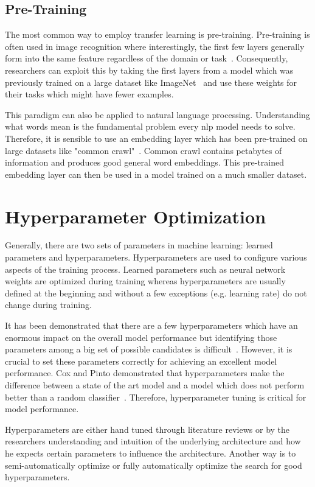 \subsection*{Pre-Training}
The most common way to employ transfer learning is pre-training. 
Pre-training is often used in image recognition where interestingly, the first few layers generally form into the same feature regardless of the domain or task~\cite{Yosinski2014}. Consequently, researchers can exploit this by taking the first layers from a model which was previously trained on a large dataset like ImageNet~\cite{Russakovsky2015} and use these weights for their tasks which might have fewer examples.
\medskip

This paradigm can also be applied to natural language processing. Understanding what words mean is the fundamental problem every \gls{nlp} model needs to solve. Therefore, it is sensible to use an embedding layer which has been pre-trained on large datasets like "common crawl"~\cite{commonCrawl}. Common crawl contains petabytes of information and produces good general word embeddings. This pre-trained embedding layer can then be used in a model trained on a much smaller dataset.
 
\section{Hyperparameter Optimization}

Generally, there are two sets of parameters in machine learning: learned parameters and hyperparameters. Hyperparameters are used to configure various aspects of the training process. Learned parameters such as neural network weights are optimized during training whereas hyperparameters are usually defined at the beginning and without a few exceptions {(e.g. learning rate)} do not change during training.
\medskip

It has been demonstrated that there are a few hyperparameters which have an enormous impact on the overall model performance but identifying those parameters among a big set of possible candidates is difficult~\cite{Bergstra2012a}. However, it is crucial to set these parameters correctly for achieving an excellent model performance. Cox and Pinto demonstrated that hyperparameters make the difference between a state of the art model and a model which does not perform better than a random classifier~\cite{Cox2011}. Therefore, hyperparameter tuning is critical for model performance.
\medskip

Hyperparameters are either hand tuned through literature reviews or by the researchers understanding and intuition of the underlying architecture and how he expects certain parameters to influence the architecture. Another way is to semi-automatically optimize or fully automatically optimize the search for good hyperparameters.
\bigskip

